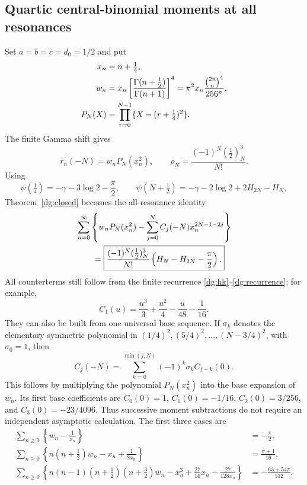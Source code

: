\subsection{Quartic central-binomial moments at all resonances}
Set $a=b=c=d_0=1/2$ and put
\begin{align}
 x_n&=n+\tfrac14,\notag\\
 w_n&=x_n\left[\frac{\Gamma(n+\tfrac12)}{\Gamma(n+1)}\right]^4
      =\pi^2x_n\frac{\binom{2n}{n}^4}{256^n},
                   \label{dg:wn}\\
 P_N(X)&=\prod_{r=0}^{N-1}\{X-(r+\tfrac14)^2\}.
                   \label{dg:PN}
\end{align}
The finite Gamma shift gives
\begin{equation}\label{dg:quarticterm}
 r_n(-N)=w_nP_N(x_n^2),\qquad
 \rho_N=\frac{(-1)^N(\tfrac12)_N^3}{N!}.
\end{equation}
Using
\[
 \psi(\tfrac14)=-\gamma-3\log2-\frac\pi2,
 \qquad
 \psi(N+\tfrac12)=-\gamma-2\log2+2H_{2N}-H_N,
\]
Theorem~\ref{dg:closed} becomes the all-resonance identity
\begin{align}
 &\sum_{n=0}^{\infty}\left\{w_nP_N(x_n^2)
            -\sum_{j=0}^{N}C_j(-N)x_n^{2N-1-2j}\right\}\notag\\
 &\qquad=\boxed{\frac{(-1)^N(\tfrac12)_N^3}{N!}
                  \left(H_N-H_{2N}-\frac\pi2\right).}
                  \label{dg:quarticall}
\end{align}
All counterterms still follow from the finite recurrence
\eqref{dg:hk}--\eqref{dg:recurrence}; for example,
\begin{equation}\label{dg:quarticC1}
 C_1(u)=\frac{u^3}{3}+\frac{u^2}{4}-\frac{u}{48}-\frac1{16}.
\end{equation}
They can also be built from one universal base sequence. If $\sigma_k$ denotes
the elementary symmetric polynomial in
$(1/4)^2,(5/4)^2,\ldots,(N-3/4)^2$, with $\sigma_0=1$, then
\begin{equation}\label{dg:quarticcoefficienttransport}
 C_j(-N)=\sum_{k=0}^{\min(j,N)}(-1)^k\sigma_k C_{j-k}(0).
\end{equation}
This follows by multiplying the polynomial $P_N(x_n^2)$ into the
base expansion of $w_n$. Its first base coefficients are
$C_0(0)=1$, $C_1(0)=-1/16$, $C_2(0)=3/256$, and
$C_3(0)=-23/4096$. Thus successive moment subtractions do not require
an independent asymptotic calculation.
The first three cases are
\begin{align}
 \sum_{n\ge0}\left\{w_n-\frac1{x_n}\right\}
       &=-\frac\pi2,\label{dg:quarticN0}\\
 \sum_{n\ge0}\left\{n(n+\tfrac12)w_n-x_n+\frac1{8x_n}\right\}
       &=\frac{\pi+1}{16},\label{dg:quarticN1}\\
 \sum_{n\ge0}\left\{n(n-1)(n+\tfrac12)(n+\tfrac32)w_n
      -x_n^3+\frac{27}{16}x_n-\frac{27}{128x_n}\right\}
       &=-\frac{63+54\pi}{512}.\label{dg:quarticN2}
\end{align}
